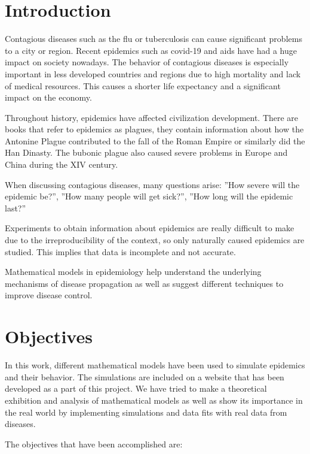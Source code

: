 \section*{Introduction}

Contagious diseases such as the flu or tuberculosis can cause significant problems to a city or region. Recent epidemics such as covid-19 and aids have had a huge impact on society nowadays. The behavior of contagious diseases is especially important in less developed countries and regions due to high mortality and lack of medical resources. This causes a shorter life expectancy and a significant impact on the economy.

Throughout history, epidemics have affected civilization development. There are books that refer to epidemics as plagues, they contain information about how the Antonine Plague contributed to the fall of the Roman Empire or similarly did the Han Dinasty. The bubonic plague also caused severe problems in Europe and China during the XIV century.

When discussing contagious diseases, many questions arise: ''How severe will the epidemic be?'', ''How many people will get sick?'', ''How long will the epidemic last?''

Experiments to obtain information about epidemics are really difficult to make due to the irreproducibility of the context, so only naturally caused epidemics are studied. This implies that data is incomplete and not accurate.

Mathematical models in epidemiology help understand the underlying mechanisms of disease propagation as well as suggest different techniques to improve disease control.

\section*{Objectives}

In this work, different mathematical models have been used to simulate epidemics and their behavior. The simulations are included on a website that has been developed as a part of this project. We have tried to make a theoretical exhibition and analysis of mathematical models as well as show its importance in the real world by implementing simulations and data fits with real data from diseases.

The objectives that have been accomplished are:

